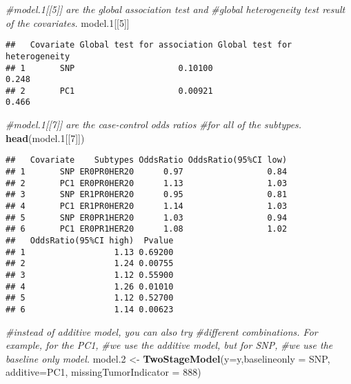 \documentclass[11pt,]{article}
\newenvironment{Shaded}{\begin{snugshade}}{\end{snugshade}}
\newcommand{\KeywordTok}[1]{\textcolor[rgb]{0.13,0.29,0.53}{\textbf{#1}}}
\newcommand{\DataTypeTok}[1]{\textcolor[rgb]{0.13,0.29,0.53}{#1}}
\newcommand{\DecValTok}[1]{\textcolor[rgb]{0.00,0.00,0.81}{#1}}
\newcommand{\StringTok}[1]{\textcolor[rgb]{0.31,0.60,0.02}{#1}}
\newcommand{\CommentTok}[1]{\textcolor[rgb]{0.56,0.35,0.01}{\textit{#1}}}
\newcommand{\NormalTok}[1]{#1}
\begin{document}
\begin{Shaded}
\begin{Highlighting}[]
\CommentTok{#model.1[[5]] are the global association test and }
\CommentTok{#global heterogeneity test result of the covariates.}
\NormalTok{model.}\DecValTok{1}\NormalTok{[[}\DecValTok{5}\NormalTok{]]}
\end{Highlighting}
\end{Shaded}

\begin{verbatim}
##   Covariate Global test for association Global test for heterogeneity
## 1       SNP                     0.10100                         0.248
## 2       PC1                     0.00921                         0.466
\end{verbatim}

\begin{Shaded}
\begin{Highlighting}[]
\CommentTok{#model.1[[7]] are the case-control odds ratios }
\CommentTok{#for all of the subtypes.}
\KeywordTok{head}\NormalTok{(model.}\DecValTok{1}\NormalTok{[[}\DecValTok{7}\NormalTok{]])}
\end{Highlighting}
\end{Shaded}

\begin{verbatim}
##   Covariate    Subtypes OddsRatio OddsRatio(95%CI low)
## 1       SNP ER0PR0HER20      0.97                 0.84
## 2       PC1 ER0PR0HER20      1.13                 1.03
## 3       SNP ER1PR0HER20      0.95                 0.81
## 4       PC1 ER1PR0HER20      1.14                 1.03
## 5       SNP ER0PR1HER20      1.03                 0.94
## 6       PC1 ER0PR1HER20      1.08                 1.02
##   OddsRatio(95%CI high)  Pvalue
## 1                  1.13 0.69200
## 2                  1.24 0.00755
## 3                  1.12 0.55900
## 4                  1.26 0.01010
## 5                  1.12 0.52700
## 6                  1.14 0.00623
\end{verbatim}

\begin{Shaded}
\begin{Highlighting}[]
\CommentTok{#instead of additive model, you can also try }
\CommentTok{#different combinations. For example, for the PC1,}
\CommentTok{#we use the additive model, but for SNP,}
\CommentTok{#we use the baseline only model.}
\NormalTok{model.}\DecValTok{2}\NormalTok{ <-}\StringTok{ }\KeywordTok{TwoStageModel}\NormalTok{(}\DataTypeTok{y=}\NormalTok{y,}\DataTypeTok{baselineonly =}\NormalTok{ SNP,}
                         \DataTypeTok{additive=}\NormalTok{PC1,}
                         \DataTypeTok{missingTumorIndicator =} \DecValTok{888}\NormalTok{)}
\end{Highlighting}
\end{Shaded}
\end{document}
